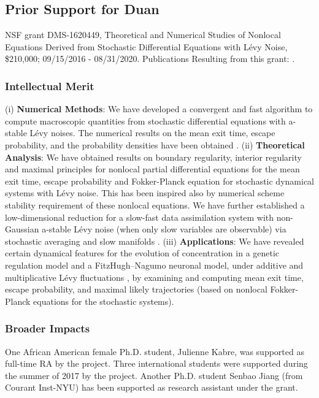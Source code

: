 \documentclass[11pt]{NSFamsart}
\begin{document}
  
 
\subsection*{Prior Support for Duan} NSF grant  DMS-1620449, Theoretical and Numerical Studies of Nonlocal Equations Derived from Stochastic Differential Equations with L\'evy Noise, \$210,000; 09/15/2016 - 08/31/2020. Publications Resulting from this grant:
 \cite{ChenWu, ChenXL2020,  DannyTesfay,GaoTing2016, Gao2016,    Liu2019LvyNI, Lv2016OnAS, QiaoDuan2018,Wang2018NumericalAF, YangDuanWiggins2020,ZhangZhuanDuan,ZhengDuan2017,ZhengYY2020}.

 
\subsubsection*{Intellectual Merit}
(i)  \textbf{Numerical Methods}:
    We have developed a convergent and fast algorithm to compute macroscopic quantities from stochastic differential equations  with a-stable L\'evy noises. The numerical results on the mean   exit time, escape probability,  and the probability densities have been obtained \cite{ChenXL2020, GaoTing2016, Gao2016,     Wang2018NumericalAF}.
(ii)  \textbf{Theoretical Analysis}:
We have obtained results on  boundary regularity, interior regularity and maximal principles for   nonlocal partial differential equations for the mean   exit time,   escape probability and Fokker-Planck equation for stochastic dynamical systems with L\'evy noise. This has been inspired also by numerical scheme stability requirement of these nonlocal equations. We have further established a  low-dimensional reduction for a slow-fast data assimilation system with non-Gaussian a-stable L\'evy noise (when only slow variables are observable) via stochastic averaging and slow manifolds \cite{Lv2016OnAS,QiaoDuan2018,   ZhangZhuanDuan,ZhengDuan2017,ZhengYY2020}.
(iii)   \textbf{Applications}:
   We have revealed certain  dynamical features  for  the evolution of concentration in a genetic regulation model \cite{ChenWu} and a
   FitzHugh–Nagumo   neuronal model,   under additive and multiplicative     L\'evy fluctuations \cite{Liu2019LvyNI}, by examining and computing mean exit time, escape probability, and maximal likely trajectories (based on nonlocal Fokker-Planck equations for the stochastic systems).


 \subsubsection*{Broader Impacts}
 One African American female Ph.D. student, Julienne Kabre, was supported as full-time RA by the project. Three international students were supported during the summer of 2017 by the project.    Another Ph.D. student Senbao Jiang (from Courant Inst-NYU)  has been supported as research assistant under the grant. 
 
\end{document}

